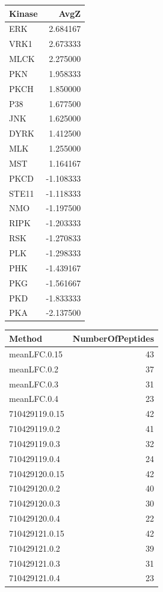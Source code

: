 \documentclass[
  letterpaper,
  DIV=11,
  numbers=noendperiod]{scrreport}
\begin{document}
\begin{longtable}[]{@{}lr@{}}
\toprule()
Kinase & AvgZ \\
\midrule()
\endhead
ERK & 2.684167 \\
VRK1 & 2.673333 \\
MLCK & 2.275000 \\
PKN & 1.958333 \\
PKCH & 1.850000 \\
P38 & 1.677500 \\
JNK & 1.625000 \\
DYRK & 1.412500 \\
MLK & 1.255000 \\
MST & 1.164167 \\
PKCD & -1.108333 \\
STE11 & -1.118333 \\
NMO & -1.197500 \\
RIPK & -1.203333 \\
RSK & -1.270833 \\
PLK & -1.298333 \\
PHK & -1.439167 \\
PKG & -1.561667 \\
PKD & -1.833333 \\
PKA & -2.137500 \\
\bottomrule()
\end{longtable}

\begin{longtable}[]{@{}lr@{}}
\toprule()
Method & NumberOfPeptides \\
\midrule()
\endhead
meanLFC.0.15 & 43 \\
meanLFC.0.2 & 37 \\
meanLFC.0.3 & 31 \\
meanLFC.0.4 & 23 \\
710429119.0.15 & 42 \\
710429119.0.2 & 41 \\
710429119.0.3 & 32 \\
710429119.0.4 & 24 \\
710429120.0.15 & 42 \\
710429120.0.2 & 40 \\
710429120.0.3 & 30 \\
710429120.0.4 & 22 \\
710429121.0.15 & 42 \\
710429121.0.2 & 39 \\
710429121.0.3 & 31 \\
710429121.0.4 & 23 \\
\bottomrule()
\end{longtable}
\end{document}
